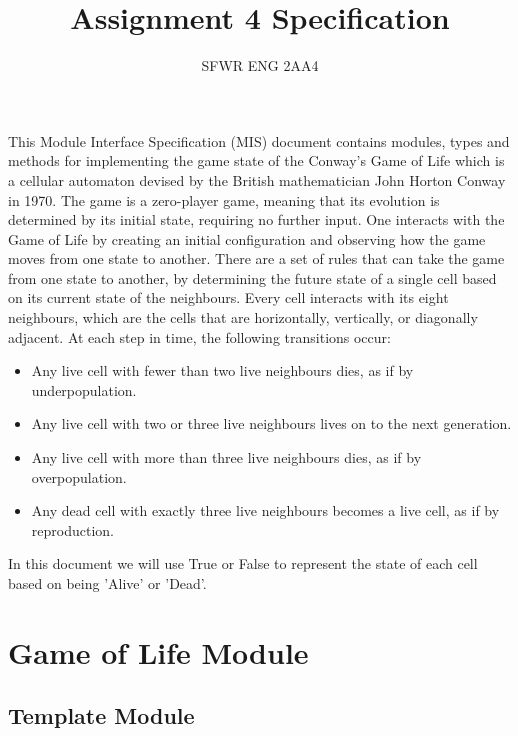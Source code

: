 \documentclass[12pt]{article}
\title{Assignment 4 Specification}
\author{SFWR ENG 2AA4}
\begin{document}
\maketitle

\noindent This Module Interface Specification (MIS) document contains modules, types and methods for implementing the game state of the Conway's Game of Life which is a cellular automaton devised by the British mathematician John Horton Conway in 1970. The game is a zero-player game, meaning that its evolution is determined by its initial state, requiring no further input. One interacts with the Game of Life by creating an initial configuration and observing how the game moves from one state to another. There are a set of rules that can take the game from one state to another, by determining the future state of a single cell based on its current state of the neighbours. Every cell interacts with its eight neighbours, which are the cells that are horizontally, vertically, or diagonally adjacent. At each step in time, the following transitions occur:
\begin{itemize}
\item Any live cell with fewer than two live neighbours dies, as if by underpopulation.
\item Any live cell with two or three live neighbours lives on to the next generation.
\item Any live cell with more than three live neighbours dies, as if by overpopulation.
\item Any dead cell with exactly three live neighbours becomes a live cell, as if by reproduction.
\end{itemize}
In this document we will use True or False to represent the state of each cell based on being 'Alive' or 'Dead'. 

\newpage

\section* {Game of Life Module}

\subsection*{Template Module}
\end{document}
